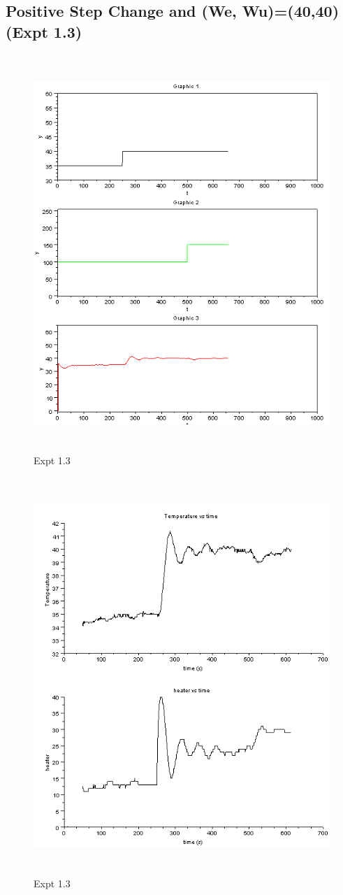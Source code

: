 \subsection{Positive Step Change and (We, Wu)=(40,40) (Expt 1.3)}
\begin{figure}[H]
  \includegraphics[width=12cm, height=15cm]{mpc/1_3.PNG}
  \caption{ Expt 1.3}
\end{figure}
\begin{figure}[H]
  \includegraphics[width=12cm, height=15cm]{mpc/1_3_heater_final.png}
  \caption{Expt 1.3}
\end{figure}
